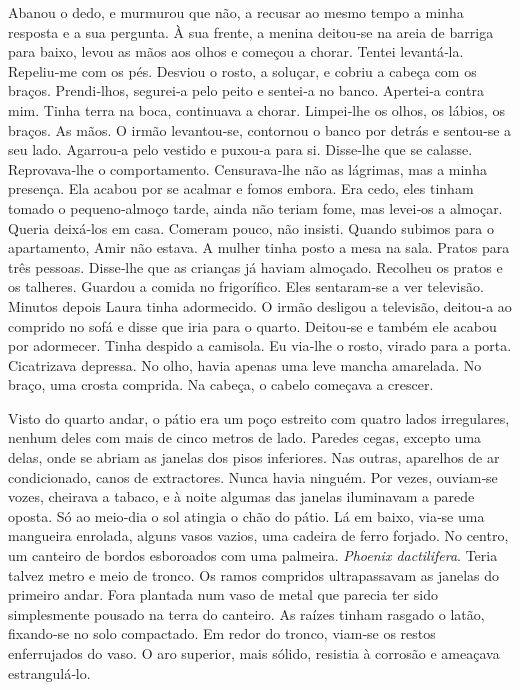 Abanou o dedo, e murmurou que não, a recusar ao mesmo tempo a minha
resposta e a sua pergunta. À sua frente, a menina deitou­‑se na areia de
barriga para baixo, levou as mãos aos olhos e começou a chorar. Tentei
levantá­‑la. Repeliu­‑me com os pés. Desviou o rosto, a soluçar, e
cobriu a cabeça com os braços. Prendi­‑lhos, segurei­‑a pelo peito e
sentei­‑a no banco. Apertei­‑a contra mim. Tinha terra na boca,
continuava a chorar. Limpei­‑lhe os olhos, os lábios, os braços. As
mãos. O irmão levantou­‑se, contornou o banco por detrás e sentou­‑se a
seu lado. Agarrou­‑a pelo vestido e puxou­‑a para si. Disse­‑lhe que se
calasse. Reprovava­‑lhe o comportamento. Censurava­‑lhe não as lágrimas,
mas a minha presença. Ela acabou por se acalmar e fomos embora. Era
cedo, eles tinham tomado o pequeno­‑almoço tarde, ainda não teriam fome,
mas levei­‑os a almoçar. Queria deixá­‑los em casa. Comeram pouco, não
insisti. Quando subimos para o apartamento, Amir não estava. A mulher
tinha posto a mesa na sala. Pratos para três pessoas. Disse­‑lhe que as
crianças já haviam almoçado. Recolheu os pratos e os talheres. Guardou a
comida no frigorífico. Eles sentaram­‑se a ver televisão. Minutos depois
Laura tinha adormecido. O irmão desligou a televisão, deitou­‑a ao
comprido no sofá e disse que iria para o quarto. Deitou­‑se e também ele
acabou por adormecer. Tinha despido a camisola. Eu via­‑lhe o rosto,
virado para a porta. Cicatrizava depressa. No olho, havia apenas uma
leve mancha amarelada. No braço, uma crosta comprida. Na cabeça, o
cabelo começava a crescer.

Visto do quarto andar, o pátio era um poço estreito com quatro lados
irregulares, nenhum deles com mais de cinco metros de lado. Paredes
cegas, excepto uma delas, onde se abriam as janelas dos pisos
inferiores. Nas outras, aparelhos de ar condicionado, canos de
extractores. Nunca havia ninguém. Por vezes, ouviam­‑se vozes, cheirava
a tabaco, e à noite algumas das janelas iluminavam a parede oposta. Só
ao meio­‑dia o sol atingia o chão do pátio. Lá em baixo, via­‑se uma
mangueira enrolada, alguns vasos vazios, uma cadeira de ferro forjado.
No centro, um canteiro de bordos esboroados com uma palmeira.
\emph{Phoenix dactilifera}. Teria talvez metro e meio de tronco. Os
ramos compridos ultrapassavam as janelas do primeiro andar. Fora
plantada num vaso de metal que parecia ter sido simplesmente pousado na
terra do canteiro. As raízes tinham rasgado o latão, fixando­‑se no solo
compactado. Em redor do tronco, viam­‑se os restos enferrujados do vaso.
O aro superior, mais sólido, resistia à corrosão e ameaçava
estrangulá­‑lo.

